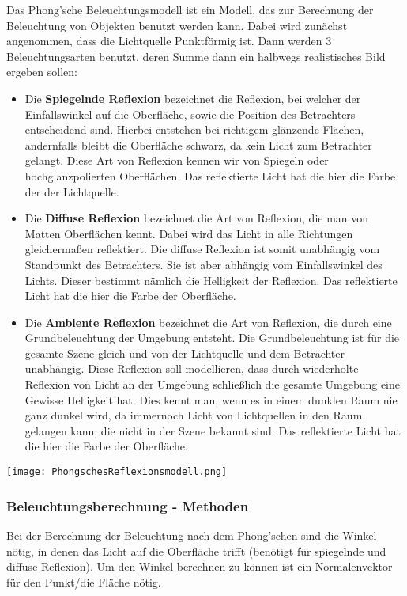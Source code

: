 Das Phong'sche Beleuchtungsmodell ist ein Modell, das zur Berechnung der Beleuchtung von Objekten benutzt werden kann. Dabei wird zunächst angenommen, dass die Lichtquelle Punktförmig ist. Dann werden 3 Beleuchtungsarten benutzt, deren Summe dann ein halbwegs realistisches Bild ergeben sollen:
\begin{itemize}
    \item Die \textbf{Spiegelnde Reflexion} bezeichnet die Reflexion, bei welcher der Einfallswinkel auf die Oberfläche, sowie die Position des Betrachters entscheidend sind. Hierbei entstehen bei richtigem glänzende Flächen, andernfalls bleibt die Oberfläche schwarz, da kein Licht zum Betrachter gelangt. Diese Art von Reflexion kennen wir von Spiegeln oder hochglanzpolierten Oberflächen. Das reflektierte Licht hat die hier die Farbe der der Lichtquelle.
    \item Die \textbf{Diffuse Reflexion} bezeichnet die Art von Reflexion, die man von Matten Oberflächen kennt. Dabei wird das Licht in alle Richtungen gleichermaßen reflektiert. Die diffuse Reflexion ist somit unabhängig vom Standpunkt des Betrachters. Sie ist aber abhängig vom Einfallswinkel des Lichts. Dieser bestimmt nämlich die Helligkeit der Reflexion. Das reflektierte Licht hat die hier die Farbe der Oberfläche.
    \item Die \textbf{Ambiente Reflexion} bezeichnet die Art von Reflexion, die durch eine Grundbeleuchtung der Umgebung entsteht. Die Grundbeleuchtung ist für die gesamte Szene gleich und von der Lichtquelle und dem Betrachter unabhängig. Diese Reflexion soll modellieren, dass durch wiederholte Reflexion von Licht an der Umgebung schließlich die gesamte Umgebung eine Gewisse Helligkeit hat. Dies kennt man, wenn es in einem dunklen Raum nie ganz dunkel wird, da immernoch Licht von Lichtquellen in den Raum gelangen kann, die nicht in der Szene bekannt sind. Das reflektierte Licht hat die hier die Farbe der Oberfläche.
\end{itemize}

\texttt{[image: PhongschesReflexionsmodell.png]}

\subsubsection{Beleuchtungsberechnung - Methoden}
Bei der Berechnung der Beleuchtung nach dem Phong'schen sind die Winkel nötig, in denen das Licht auf die Oberfläche trifft (benötigt für spiegelnde und diffuse Reflexion). Um den Winkel berechnen zu können ist ein Normalenvektor für den Punkt/die Fläche nötig.

